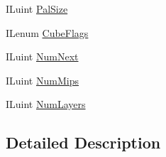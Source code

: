 \begin{DoxyCompactItemize}
ILuint \hyperlink{struct_tao_1_1_dev_il_1_1_i_linfo_a6aa64d22c0d698c80cb10d67eccc03b7}{PalSize}
\item 
ILenum \hyperlink{struct_tao_1_1_dev_il_1_1_i_linfo_a7f251988d4654b770ef5659472680b2b}{CubeFlags}
\item 
ILuint \hyperlink{struct_tao_1_1_dev_il_1_1_i_linfo_a1811e11714fa70727bc1e81bce844c43}{NumNext}
\item 
ILuint \hyperlink{struct_tao_1_1_dev_il_1_1_i_linfo_af13b1acd874d86aeb3af5017ba2639b4}{NumMips}
\item 
ILuint \hyperlink{struct_tao_1_1_dev_il_1_1_i_linfo_a6c0e2973518c60463ce37960a3ca3879}{NumLayers}
\end{DoxyCompactItemize}


\subsection{Detailed Description}


